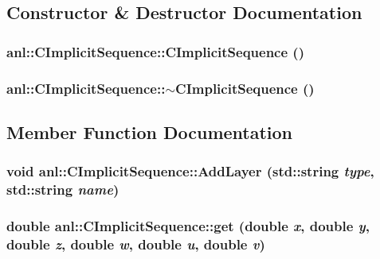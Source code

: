 \subsection{Constructor \& Destructor Documentation}
\hypertarget{classanl_1_1CImplicitSequence_ac7c6662b9d0cdbeabcd77b417d5e8573}{
\subsubsection[{CImplicitSequence}]{\setlength{\rightskip}{0pt plus 5cm}anl::CImplicitSequence::CImplicitSequence ()}}
\label{classanl_1_1CImplicitSequence_ac7c6662b9d0cdbeabcd77b417d5e8573}
\hypertarget{classanl_1_1CImplicitSequence_a79c6f6db15aacb1dcc8c766679573ffc}{
\subsubsection[{$\sim$CImplicitSequence}]{\setlength{\rightskip}{0pt plus 5cm}anl::CImplicitSequence::$\sim$CImplicitSequence ()}}
\label{classanl_1_1CImplicitSequence_a79c6f6db15aacb1dcc8c766679573ffc}


\subsection{Member Function Documentation}
\hypertarget{classanl_1_1CImplicitSequence_a79cf08cdd1a0056a6640c97680042068}{
\subsubsection[{AddLayer}]{\setlength{\rightskip}{0pt plus 5cm}void anl::CImplicitSequence::AddLayer (std::string {\em type}, \/  std::string {\em name})}}
\label{classanl_1_1CImplicitSequence_a79cf08cdd1a0056a6640c97680042068}
\hypertarget{classanl_1_1CImplicitSequence_ad4333da8f7c124beb652a2de7b637753}{
\subsubsection[{get}]{\setlength{\rightskip}{0pt plus 5cm}double anl::CImplicitSequence::get (double {\em x}, \/  double {\em y}, \/  double {\em z}, \/  double {\em w}, \/  double {\em u}, \/  double {\em v})}}
\label{classanl_1_1CImplicitSequence_ad4333da8f7c124beb652a2de7b637753}


